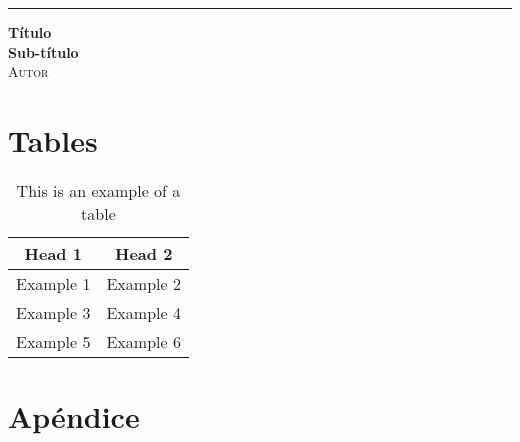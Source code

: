 \documentclass[12pt]{article}
\begin{document}
	\begin{titlepage}
		\raggedleft %
	
		\rule{1pt}{\textheight} %
		\hspace{0.05\textwidth} %
		\parbox[b]{0.75\textwidth}{ %
		
		{\Huge\bfseries Título\\[0.5\baselineskip] Sub-título}\\[2\baselineskip] %
		{\Large\textsc{Autor}} %
		
		\vspace{0.5\textheight} %
		}
	\end{titlepage}
	\newpage
	\tableofcontents
	\newpage
	\section{Tables}
	\begin{table}[H]
		\centering
		\begin{tabular}{|c|c|}
		  \rowcolor{gray!50}
		  \hline
			Head 1 & Head 2 \\
			\hline
			Example 1 & Example 2 \\
			Example 3 & Example 4 \\
			Example 5 & Example 6 \\
			\hline
		\end{tabular}
		\caption{This is an example of a table}
		\label{tab: 01}
	\end{table}
	\section{Apéndice}
	\listoffigures
	\listoftables
\end{document}
